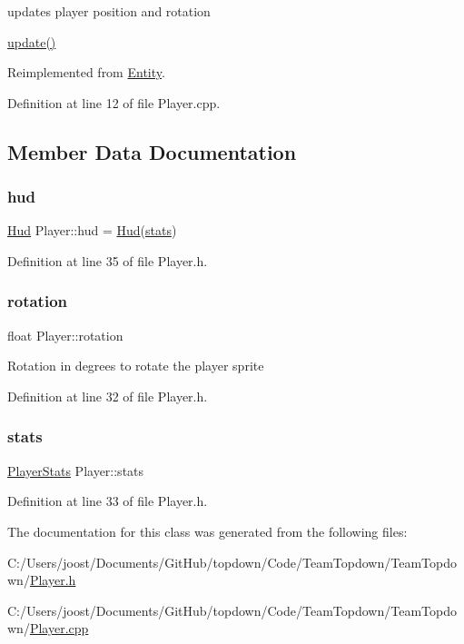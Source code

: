 updates player position and rotation 

\hyperlink{class_player_a6912bb6e48efb5845d59f0f4582827ef}{update()} 

Reimplemented from \hyperlink{class_entity_aed73e98b980b85833428c935cc1c69f8}{Entity}.



Definition at line 12 of file Player.\+cpp.



\subsection{Member Data Documentation}
\mbox{\label{class_player_a53a16e90cfe0982879f2f993ee2c7e88}} 
\subsubsection{\texorpdfstring{hud}{hud}}
{\footnotesize\ttfamily \hyperlink{class_hud}{Hud} Player\+::hud = \hyperlink{class_hud}{Hud}(\hyperlink{class_player_af9bb9d1de3b674a869b2c58b702e9036}{stats})}



Definition at line 35 of file Player.\+h.

\mbox{\label{class_player_ad94d3e5ab67795f8f848a7fd565f376f}} 
\subsubsection{\texorpdfstring{rotation}{rotation}}
{\footnotesize\ttfamily float Player\+::rotation}

Rotation in degrees to rotate the player sprite 

Definition at line 32 of file Player.\+h.

\mbox{\label{class_player_af9bb9d1de3b674a869b2c58b702e9036}} 
\subsubsection{\texorpdfstring{stats}{stats}}
{\footnotesize\ttfamily \hyperlink{struct_player_stats}{Player\+Stats} Player\+::stats}



Definition at line 33 of file Player.\+h.



The documentation for this class was generated from the following files\+:\begin{DoxyCompactItemize}
\item 
C\+:/\+Users/joost/\+Documents/\+Git\+Hub/topdown/\+Code/\+Team\+Topdown/\+Team\+Topdown/\hyperlink{_player_8h}{Player.\+h}\item 
C\+:/\+Users/joost/\+Documents/\+Git\+Hub/topdown/\+Code/\+Team\+Topdown/\+Team\+Topdown/\hyperlink{_player_8cpp}{Player.\+cpp}\end{DoxyCompactItemize}
